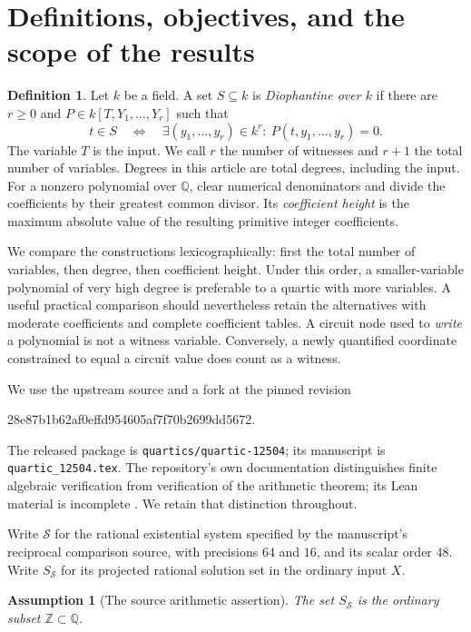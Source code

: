 \documentclass[11pt]{article}
\newtheorem{assumption}[theorem]{Assumption}
\theoremstyle{definition}
\newtheorem{definition}[theorem]{Definition}
\newcommand{\Q}{\mathbb Q}
\newcommand{\Z}{\mathbb Z}
\newcommand{\Src}{\mathcal S}
\begin{document}
\section{Definitions, objectives, and the scope of the results}
\label{sec:scope}

\begin{definition}
Let $k$ be a field. A set $S\subseteq k$ is \emph{Diophantine over $k$}
if there are $r\geq0$ and $P\in k[T,Y_1,\ldots,Y_r]$ such that
\[
 t\in S\quad\Longleftrightarrow\quad
 \exists(y_1,\ldots,y_r)\in k^r:\ P(t,y_1,\ldots,y_r)=0.
\]
The variable $T$ is the input. We call $r$ the number of witnesses and
$r+1$ the total number of variables. Degrees in this article are total
degrees, including the input. For a nonzero polynomial over $\Q$, clear
numerical denominators and divide the coefficients by their greatest
common divisor. Its \emph{coefficient height} is the maximum absolute
value of the resulting primitive integer coefficients.
\end{definition}

We compare the constructions lexicographically: first the total
number of variables, then degree, then coefficient height. Under this
order, a smaller-variable polynomial of very high degree is preferable
to a quartic with more variables. A useful practical comparison should
nevertheless retain the alternatives with moderate coefficients and
complete coefficient tables. A circuit node used to \emph{write} a
polynomial is not a witness variable. Conversely, a newly quantified
coordinate constrained to equal a circuit value does count as a witness.

We use the upstream source and a fork at the pinned revision
\begin{center}\small\ttfamily
28e87b1b62af0effd954605af7f70b2699dd5672.
\end{center}
The released package is \texttt{quartics/quartic-12504}; its manuscript
is \texttt{quartic\_12504.tex}. The repository's own documentation
distinguishes finite algebraic verification from verification of the
arithmetic theorem; its Lean material is incomplete
\cite{Repository2026}. We retain that distinction throughout.

Write $\Src$ for the rational existential system specified by the
manuscript's reciprocal comparison source, with precisions $64$ and
$16$, and its scalar order $48$. Write $S_{\Src}$ for its projected
rational solution set in the ordinary input $X$.

\begin{assumption}[The source arithmetic assertion]\label{ass:source}
The set $S_{\Src}$ is the ordinary subset $\Z\subset\Q$.
\end{assumption}
\end{document}
